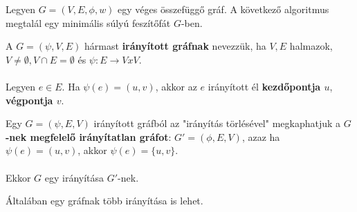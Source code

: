 \begin{frame}
\begin{tcolorbox}[title={Tétel: Kruskal algoritmus}]
Legyen $G = (V, E, {\phi}, w)$ egy véges összefüggő gráf. A következő algoritmus megtalál egy minimális súlyú feszítőfát $G$-ben.
\end{tcolorbox}

\end{frame}

\begin{frame}
\begin{tcolorbox}[title={Def.: Irányított gráf}]
A $G = ({\psi}, V, E)$ hármast \textbf{irányított gráfnak} nevezzük, ha $V, E$ halmazok, $V \neq \emptyset, V \cap E = \emptyset$ és $\psi : E \rightarrow V x V$.\\
\\
Legyen $e \in E$. Ha ${\psi}(e) = (u, v)$, akkor az $e$ irányított él \textbf{kezdőpontja $u$}, \textbf{végpontja $v$}.
\end{tcolorbox}

\begin{tcolorbox}[title={Def.: Gráf irányítása}]
Egy $G = ({\psi}, E, V)$ irányított gráfból az "irányítás törlésével" megkaphatjuk a \textbf{$G$-nek megfelelő irányítatlan gráfot}: $G' = ({\phi}, E, V)$, azaz ha ${\psi}(e) = (u, v)$, akkor ${\psi}(e) = \{u, v\}$.\\
\\
Ekkor $G$ egy irányítása $G'$-nek.
\end{tcolorbox}

\begin{tcolorbox}[title={Ész}]
Általában egy gráfnak több irányítása is lehet.
\end{tcolorbox}
\end{frame}


